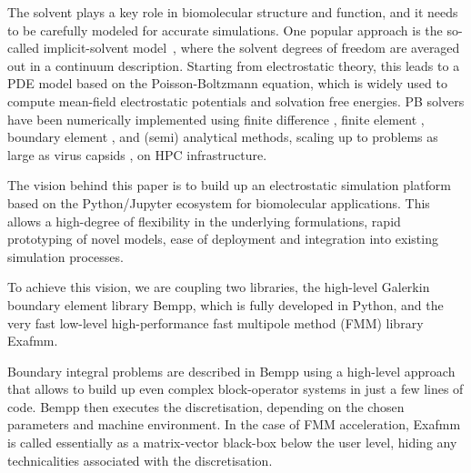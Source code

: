 The solvent plays a key role in biomolecular structure and function, and it needs to be carefully modeled for accurate simulations. 
One popular approach is the so-called implicit-solvent model~\cite{RouxSimonson1999,DecherchiETal2015}, where the solvent degrees of freedom are averaged out in a continuum description.
Starting from electrostatic theory, this leads to a PDE model based on the Poisson-Boltzmann equation, which is widely used to compute mean-field electrostatic potentials and solvation free energies.
PB solvers have been numerically implemented using finite difference \cite{RocchiaAlexovHonig2001, BakerETal2001}, finite element \cite{BakerETal2001,BondETal2010,HolstETal2012}, boundary element \cite{AltmanBardhanWhiteTidor2009, GengKrasny2013, ZhangPengHuangPitsianisSunLu2015, CooperBardhanBarba2014}, and (semi) analytical \cite{LotanHead-Gordon2006,FelbergETal2017} methods, scaling up to problems as large as virus capsids \cite{ZhangETal2019,MartinezETal2019}, on HPC infrastructure.

The vision behind this paper is to build up an electrostatic simulation platform based on the Python/Jupyter ecosystem for biomolecular applications. This allows a high-degree of flexibility in the underlying formulations, rapid prototyping of novel models, ease of deployment and integration into existing simulation processes.

To achieve this vision, we are coupling two libraries, the high-level Galerkin boundary element library Bempp, which is fully developed in Python, and the very fast low-level high-performance fast multipole method (FMM) library Exafmm. 

Boundary integral problems are described in Bempp using a high-level approach that allows to build up even complex block-operator systems in just a few lines of code. Bempp then executes the discretisation, depending on the chosen parameters and machine environment. In the case of FMM acceleration, Exafmm is called essentially as a matrix-vector black-box below the user level, hiding any technicalities associated with the discretisation.

